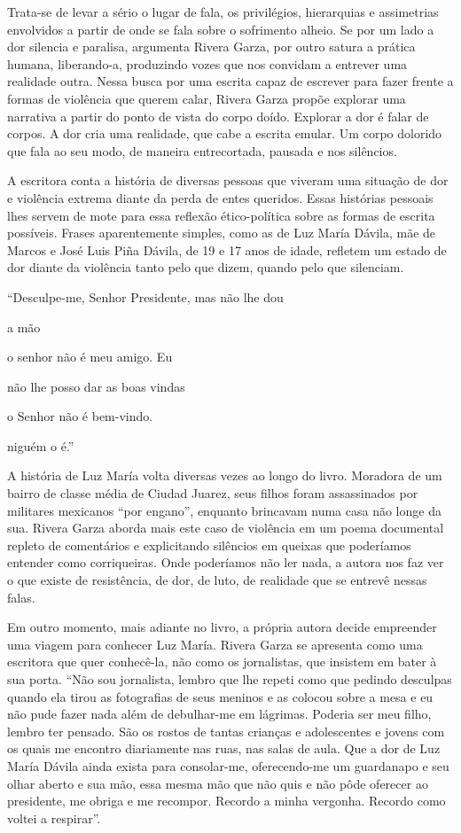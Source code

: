 Trata-se de levar a sério o lugar de fala, os privilégios, hierarquias e
assimetrias envolvidos a partir de onde se fala sobre o sofrimento
alheio. Se por um lado a dor silencia e paralisa, argumenta Rivera
Garza, por outro satura a prática humana, liberando-a, produzindo vozes
que nos convidam a entrever uma realidade outra. Nessa busca por uma
escrita capaz de escrever para fazer frente a formas de violência que
querem calar, Rivera Garza propõe explorar uma narrativa a partir do
ponto de vista do corpo doído. Explorar a dor é falar de corpos. A dor
cria uma realidade, que cabe a escrita emular. Um corpo dolorido que
fala ao seu modo, de maneira entrecortada, pausada e nos silêncios.

A escritora conta a história de diversas pessoas que viveram uma
situação de dor e violência extrema diante da perda de entes queridos.
Essas histórias pessoais lhes servem de mote para essa reflexão
ético-política sobre as formas de escrita possíveis. Frases
aparentemente simples, como as de Luz María Dávila, mãe de Marcos e José
Luis Piña Dávila, de 19 e 17 anos de idade, refletem um estado de dor
diante da violência tanto pelo que dizem, quando pelo que silenciam.

``Desculpe-me, Senhor Presidente, mas não lhe dou

a mão

o senhor não é meu amigo. Eu

não lhe posso dar as boas vindas

o Senhor não é bem-vindo.

niguém o é.''

A história de Luz María volta diversas vezes ao longo do livro. Moradora
de um bairro de classe média de Ciudad Juarez, seus filhos foram
assassinados por militares mexicanos ``por engano'', enquanto brincavam
numa casa não longe da sua. Rivera Garza aborda mais este caso de
violência em um poema documental repleto de comentários e explicitando
silêncios em queixas que poderíamos entender como corriqueiras. Onde
poderíamos não ler nada, a autora nos faz ver o que existe de
resistência, de dor, de luto, de realidade que se entrevê nessas falas.

Em outro momento, mais adiante no livro, a própria autora decide
empreender uma viagem para conhecer Luz María. Rivera Garza se apresenta
como uma escritora que quer conhecê-la, não como os jornalistas, que
insistem em bater à sua porta. ``Não sou jornalista, lembro que lhe
repeti como que pedindo desculpas quando ela tirou as fotografias de
seus meninos e as colocou sobre a mesa e eu não pude fazer nada além de
debulhar-me em lágrimas. Poderia ser meu filho, lembro ter pensado. São
os rostos de tantas crianças e adolescentes e jovens com os quais me
encontro diariamente nas ruas, nas salas de aula. Que a dor de Luz María
Dávila ainda exista para consolar-me, oferecendo-me um guardanapo e seu
olhar aberto e sua mão, essa mesma mão que não quis e não pôde oferecer
ao presidente, me obriga e me recompor. Recordo a minha vergonha.
Recordo como voltei a respirar''.


